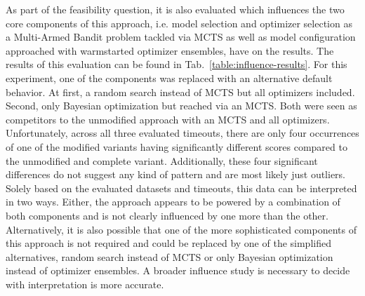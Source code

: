 As part of the feasibility question, it is also evaluated which influences the two core components of this approach, i.e. model selection and optimizer selection as a Multi-Armed Bandit problem tackled via MCTS as well as model configuration approached with warmstarted optimizer ensembles, have on the results.
The results of this evaluation can be found in Tab.~\ref{table:influence-results}.\newline
For this experiment, one of the components was replaced with an alternative default behavior.
At first, a random search instead of MCTS but all optimizers included.
Second, only Bayesian optimization but reached via an MCTS.
Both were seen as competitors to the unmodified approach with an MCTS and all optimizers.\newline
Unfortunately, across all three evaluated timeouts, there are only four occurrences of one of the modified variants having significantly different scores compared to the unmodified and complete variant.
Additionally, these four significant differences do not suggest any kind of pattern and are most likely just outliers.\newline
Solely based on the evaluated datasets and timeouts, this data can be interpreted in two ways.
Either, the approach appears to be powered by a combination of both components and is not clearly influenced by one more than the other.
Alternatively, it is also possible that one of the more sophisticated components of this approach is not required and could be replaced by one of the simplified alternatives, random search instead of MCTS or only Bayesian optimization instead of optimizer ensembles.
A broader influence study is necessary to decide with interpretation is more accurate.

